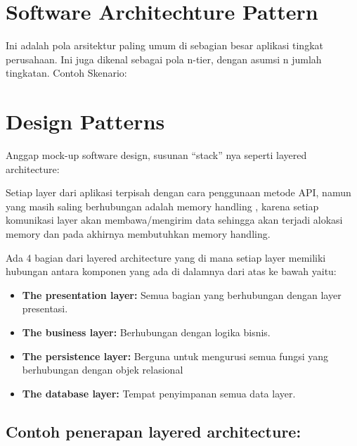 \section{Software Architechture Pattern}
Ini adalah pola arsitektur paling umum di sebagian besar aplikasi tingkat perusahaan. Ini juga dikenal sebagai pola n-tier, dengan asumsi n jumlah tingkatan. Contoh Skenario:



\section{Design Patterns}

Anggap mock-up software design, susunan “stack” nya seperti layered architecture:


Setiap layer dari aplikasi terpisah dengan cara penggunaan metode API, namun yang masih saling berhubungan adalah memory handling , karena setiap komunikasi layer akan membawa/mengirim data sehingga akan terjadi alokasi memory dan pada akhirnya membutuhkan memory handling.

Ada 4 bagian dari layered architecture yang di mana setiap layer memiliki hubungan antara komponen yang ada di dalamnya dari atas ke bawah yaitu:

\begin{itemize}
    \item \textbf{The presentation layer:} Semua bagian yang berhubungan dengan layer presentasi.
    \item \textbf{The business layer:} Berhubungan dengan logika bisnis.
    \item \textbf{The persistence layer:} Berguna untuk mengurusi semua fungsi yang berhubungan dengan objek relasional
    \item \textbf{The database layer:} Tempat penyimpanan semua data layer.
\end{itemize}

\subsection{Contoh penerapan layered architecture:}


